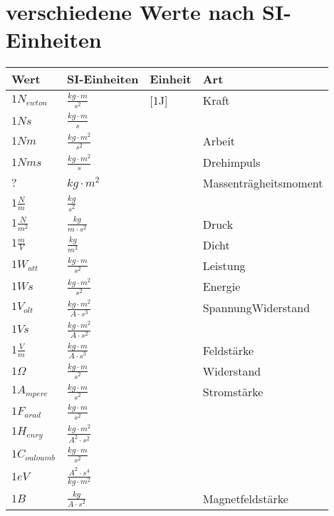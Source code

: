 \section*{verschiedene Werte nach SI-Einheiten}
\begin{table}[here]
\begin{tabular}{llll}
Wert			 & SI-Einheiten				&Einheit& Art			\\\toprule
$1N_{ewton}		$&$ \frac{kg\cdot m}{s^2}		$&[1J]	&  Kraft		\\\midrule
$1Ns			$&$ \frac{kg\cdot m}{s}			$&	& 	 		\\\midrule
$1Nm			$&$ \frac{kg\cdot m^2}{s^2}		$&	&  Arbeit 		\\\midrule
$1Nms			$&$ \frac{kg\cdot m^2}{s}		$&	&  Drehimpuls		\\\midrule
$?$			 &$ kg\cdot m^2				$&	&  Massenträgheitsmoment\\\midrule
$1\frac{N}{m}		$&$ \frac{kg}{s^2}			$&	&  			\\\midrule
$1\frac{N}{m^2}		$&$ \frac{kg}{m\cdot s^2}		$&	&  Druck		\\\midrule
$1\frac{m}{V}		$&$ \frac{kg}{m^3}			$&	&  Dicht		\\\midrule
$1W_{att}		$&$ \frac{kg\cdot m}{s^2}		$&	&  Leistung		\\\midrule
$1Ws			$&$ \frac{kg\cdot m^2}{s^2}		$&	&  Energie		\\\midrule
$1V_{olt}		$&$ \frac{kg\cdot m^2}{A\cdot s^3}	$&	&  SpannungWiderstand	\\\midrule
$1Vs			$&$ \frac{kg\cdot m^2}{A\cdot s^2}	$&	&  			\\\midrule
$1\frac{V}{m}		$&$ \frac{kg\cdot m}{A\cdot s^3}	$&	&  Feldstärke		\\\midrule
$1\Omega		$&$ \frac{kg\cdot m}{s^2}		$&	&  Widerstand		\\\midrule
$1A_{mpere}		$&$ \frac{kg\cdot m}{s^2}		$&	&  Stromstärke		\\\midrule
$1F_{arad}		$&$ \frac{kg\cdot m}{s^2}		$&	& 			\\\midrule
$1H_{enry}		$&$ \frac{kg\cdot m^2}{A^2\cdot s^2}	$&	& 			\\\midrule
$1C_{ouloumb}		$&$ \frac{kg\cdot m}{s^2}		$&	& 			\\\midrule
$1eV			$&$ \frac{A^2\cdot s^4}{kg\cdot m^2}	$&	& 			\\\midrule
$1B			$&$ \frac{kg}{A\cdot s^2}		$&	&  Magnetfeldstärke	\\\midrule
\end{tabular}
\end{table}